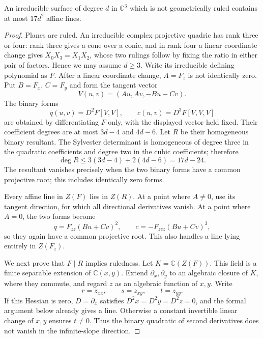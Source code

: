 \begin{lemma}\label{ci:flecnode}
An irreducible surface of degree $d$ in $\mathbb C^3$ which is not
geometrically ruled contains at most $17d^2$ affine lines.
\end{lemma}

\begin{proof}
Planes are ruled.  An irreducible complex projective quadric has
rank three or four: rank three gives a cone over a conic, and in
rank four a linear coordinate change gives $X_0X_3=X_1X_2$,
whose two rulings follow by fixing the ratio in either pair of
factors.  Hence we may assume $d\ge3$.
Write its irreducible defining polynomial as $F$.  After a linear
coordinate change, $A=F_z$ is not identically zero.  Put $B=F_x$,
$C=F_y$ and form the tangent vector
\[
 V(u,v)=(Au,Av,-Bu-Cv).
\]
The binary forms
\[
 q(u,v)=D^2F[V,V],\qquad c(u,v)=D^3F[V,V,V]
\]
are obtained by differentiating $F$ only, with the displayed vector
held fixed.  Their coefficient degrees are at most $3d-4$ and
$4d-6$.  Let $R$ be their homogeneous binary resultant.  The
Sylvester determinant is homogeneous of degree three in the
quadratic coefficients and degree two in the cubic coefficients;
therefore
\begin{equation}\label{ci:resultant-degree}
 \deg R\le3(3d-4)+2(4d-6)=17d-24.
\end{equation}
The resultant vanishes precisely when the two binary forms have a
common projective root; this includes identically zero forms.

Every affine line in $Z(F)$ lies in $Z(R)$.  At a point where
$A\ne0$, use its tangent direction, for which all directional
derivatives vanish.  At a point where $A=0$, the two forms become
\[
 q=F_{zz}(Bu+Cv)^2,\qquad
 c=-F_{zzz}(Bu+Cv)^3,
\]
so they again have a common projective root.  This also handles a
line lying entirely in $Z(F_z)$.

We next prove that $F\mid R$ implies ruledness.  Let
$K=\mathbb C(Z(F))$.  This field is a finite separable extension of
$\mathbb C(x,y)$.  Extend $\partial_x,\partial_y$ to an algebraic
closure of $K$, where they commute, and regard $z$ as an algebraic
function of $x,y$.  Write
\[
 r=z_{xx},\qquad s=z_{xy},\qquad t=z_{yy}.
\]
If this Hessian is zero, $D=\partial_x$ satisfies
$D^2x=D^2y=D^2z=0$, and the formal argument below already gives a
line.  Otherwise a constant invertible linear change of $x,y$
ensures $t\ne0$.  Thus the binary quadratic of second derivatives
does not vanish in the infinite-slope direction.


\end{proof}
